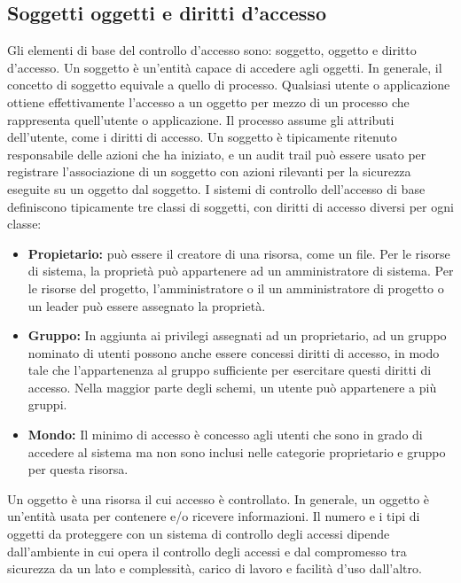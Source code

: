 \subsection{Soggetti oggetti e diritti d'accesso}
Gli elementi di base del controllo d'accesso sono: soggetto, oggetto e diritto d'accesso.
\singlespacing
Un soggetto è un'entità capace di accedere agli oggetti. In generale, il concetto di soggetto equivale a quello di processo. Qualsiasi utente o applicazione ottiene effettivamente l'accesso a un oggetto per mezzo di un processo che rappresenta quell'utente o applicazione. Il processo assume gli attributi dell'utente, come i diritti di accesso.
\singlespacing
Un soggetto è tipicamente ritenuto responsabile delle azioni che ha iniziato, e un audit trail può essere usato per registrare l'associazione di un soggetto con azioni rilevanti per la sicurezza eseguite su un oggetto dal soggetto.
I sistemi di controllo dell'accesso di base definiscono tipicamente tre classi di soggetti, con diritti di accesso diversi per ogni classe:
\begin{itemize}
    \item \textbf{Propietario:} può essere il creatore di una risorsa, come un file. Per le risorse di sistema, la proprietà può appartenere ad un amministratore di sistema. Per le risorse del progetto, l'amministratore o il un amministratore di progetto o un leader può essere assegnato la proprietà.
    
    \item \textbf{Gruppo:} In aggiunta ai privilegi assegnati ad un proprietario, ad un gruppo nominato di utenti possono anche essere concessi diritti di accesso, in modo tale che l'appartenenza al gruppo sufficiente per esercitare questi diritti di accesso. Nella maggior parte degli schemi, un utente può appartenere a più gruppi.
    
    \item \textbf{Mondo:} Il minimo di accesso è concesso agli utenti che sono in grado di accedere al sistema ma non sono inclusi nelle categorie proprietario e gruppo per questa risorsa.
\end{itemize}
Un oggetto è una risorsa il cui accesso è controllato. In generale, un oggetto è un'entità usata per contenere e/o ricevere informazioni.
\singlespacing
Il numero e i tipi di oggetti da proteggere con un sistema di controllo degli accessi dipende dall'ambiente in cui opera il controllo degli accessi e dal compromesso tra sicurezza da un lato e complessità, carico di lavoro e facilità d'uso dall'altro.
\singlespacing
